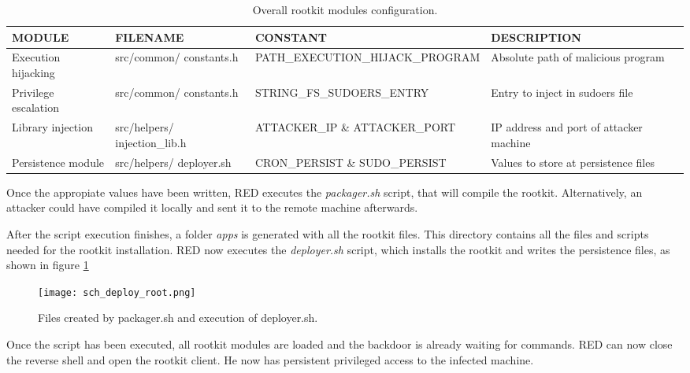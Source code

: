 \begin{table}[htbp]
\begin{tabular}{|>{\centering\arraybackslash}p{2cm}|>{\centering\arraybackslash}p{3cm}|>{\centering\arraybackslash}p{4cm}|>{\centering\arraybackslash}p{4cm}|}
\hline
\textbf{MODULE} & \textbf{FILENAME} & \textbf{CONSTANT} & \textbf{DESCRIPTION}\\
\hline
\hline
Execution hijacking & src/common/ constants.h & PATH\_EXECUTION\_HIJACK\_PROGRAM & Absolute path of malicious program\\
\hline
Privilege escalation & src/common/ constants.h & STRING\_FS\_SUDOERS\_ENTRY & Entry to inject in sudoers file\\
\hline
Library injection & src/helpers/ injection\_lib.h & ATTACKER\_IP \& ATTACKER\_PORT & IP address and port of attacker machine\\
\hline
Persistence module & src/helpers/ deployer.sh & CRON\_PERSIST \& SUDO\_PERSIST & Values to store at persistence files\\
\hline
\end{tabular}
\caption{Overall rootkit modules configuration.}
\label{table:rootkit_config}
\end{table}

Once the appropiate values have been written, RED executes the \textit{packager.sh} script, that will compile the rootkit. Alternatively, an attacker could have compiled it locally and sent it to the remote machine afterwards.

After the script execution finishes, a folder \textit{apps} is generated with all the rootkit files. This directory contains all the files and scripts needed for the rootkit installation. RED now executes the \textit{deployer.sh} script, which installs the rootkit and writes the persistence files, as shown in figure \ref{fig:deploy_root}

\begin{figure}[htbp]
	\centering
	\texttt{[image: sch\_deploy\_root.png]}
	\caption{Files created by packager.sh and execution of deployer.sh.}
	\label{fig:deploy_root}
\end{figure}

Once the script has been executed, all rootkit modules are loaded and the backdoor is already waiting for commands. RED can now close the reverse shell and open the rootkit client. He now has persistent privileged access to the infected machine.

